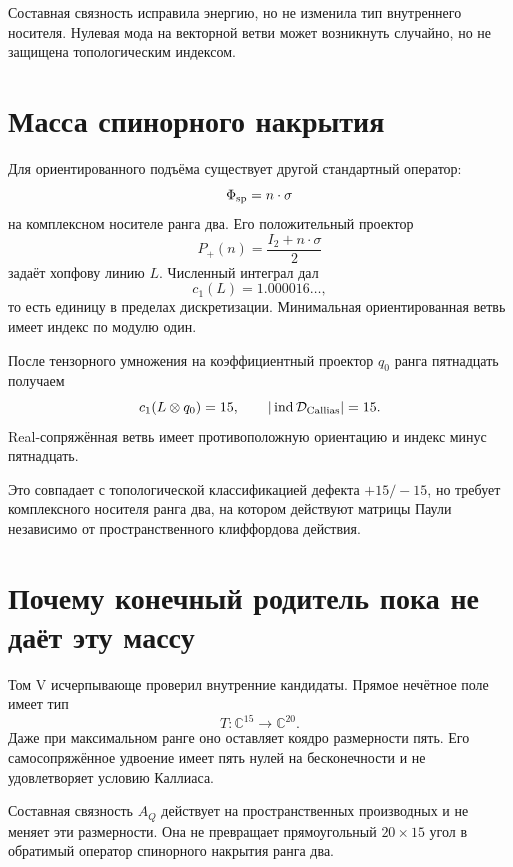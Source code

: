 Составная связность исправила энергию, но не изменила тип внутреннего
носителя. Нулевая мода на векторной ветви может возникнуть случайно, но не
защищена топологическим индексом.

\section{Масса спинорного накрытия}

Для ориентированного подъёма существует другой стандартный оператор:
\begin{equation}
 \Phi_{\rm sp}=n\cdot\sigma
\end{equation}
на комплексном носителе ранга два. Его положительный проектор
\begin{equation}
 P_+(n)=\frac{I_2+n\cdot\sigma}{2}
\end{equation}
задаёт хопфову линию $L$. Численный интеграл дал
\begin{equation}
 c_1(L)=1.000016\ldots,
\end{equation}
то есть единицу в пределах дискретизации. Минимальная ориентированная
ветвь имеет индекс по модулю один.

После тензорного умножения на коэффициентный проектор $q_0$ ранга
пятнадцать получаем
\begin{equation}
 c_1(L\otimes q_0)=15,
 \qquad
 |\operatorname{ind}\mathcal D_{\rm Callias}|=15.
 \label{eq:v6-spin-cover-callias-fifteen}
\end{equation}
Real-сопряжённая ветвь имеет противоположную ориентацию и индекс минус
пятнадцать.

Это совпадает с топологической классификацией дефекта $+15/-15$, но
требует комплексного носителя ранга два, на котором действуют матрицы
Паули независимо от пространственного клиффордова действия.

\section{Почему конечный родитель пока не даёт эту массу}

Том V исчерпывающе проверил внутренние кандидаты. Прямое нечётное поле
имеет тип
\begin{equation}
 T:\mathbb C^{15}\longrightarrow\mathbb C^{20}.
\end{equation}
Даже при максимальном ранге оно оставляет коядро размерности пять. Его
самосопряжённое удвоение имеет пять нулей на бесконечности и не
удовлетворяет условию Каллиаса.

Составная связность $A_Q$ действует на пространственных производных и не
меняет эти размерности. Она не превращает прямоугольный $20\times15$
угол в обратимый оператор спинорного накрытия ранга два.

